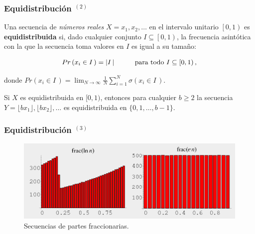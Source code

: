 \documentclass[t, 10pt, mathserif]{beamer}
\begin{document}

\begin{frame}
  \frametitle{Equidistribución {$^{(2)}$}}

  Una secuencia de \textit{números reales} $X = x_1, x_2, \dots$ en el intervalo unitario $\left[0, 1\right)$ es \textbf{equidistribuida} si, dado cualquier conjunto $I \subseteq \left[0, 1\right)$, la frecuencia asintótica con la que la secuencia toma valores en $I$ es igual a su tamaño:
  \pause

  \begin{equation*}
    \begin{aligned}
      Pr \left( x_i \in I\, \right) = \left| I\, \right| \hspace*{1cm} \text{para todo } I \subseteq \left[0, 1\right) \text{,}
    \end{aligned}
  \end{equation*}
  \pause

  \vspace{-0.5cm}
  donde $\displaystyle Pr \left( x_i \in I\, \right) = \lim_{N \to \infty} \frac{1}{N} \sum_{i = 1}^{N} \sigma(x_i \in I\,)$.
  \pause

  Si $X$ es equidistribuida en $[0, 1)$, entonces para cualquier $b \ge 2$ la secuencia $Y = \lfloor b x_1 \rfloor, \lfloor b x_2 \rfloor, \dots$ es equidistribuida en $\{ 0, 1, \dots, b - 1 \}$.
\end{frame}


\begin{frame}
  \frametitle{Equidistribución {$^{(3)}$}}

  \vspace{1cm}
  \begin{figure}
    \includegraphics[scale=0.4]{resources/equidistribucion.png}
    \caption{Secuencias de partes fraccionarias.}
  \end{figure}
\end{frame}
 
\end{document}
